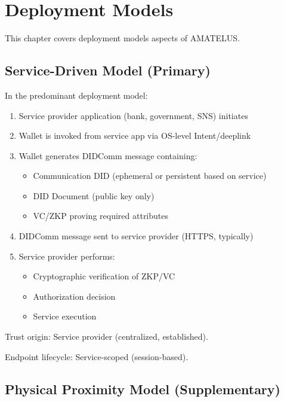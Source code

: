 \chapter{Deployment Models}


\begin{definition}
  \label{def:dep-chapter}
  This chapter covers deployment models aspects of AMATELUS.
  \leanok
\end{definition}
\section{Service-Driven Model (Primary)}

In the predominant deployment model:
\begin{enumerate}
  \item Service provider application (bank, government, SNS) initiates
  \item Wallet is invoked from service app via OS-level Intent/deeplink
  \item Wallet generates DIDComm message containing:
    \begin{itemize}
      \item Communication DID (ephemeral or persistent based on service)
      \item DID Document (public key only)
      \item VC/ZKP proving required attributes
    \end{itemize}
  \item DIDComm message sent to service provider (HTTPS, typically)
  \item Service provider performs:
    \begin{itemize}
      \item Cryptographic verification of ZKP/VC
      \item Authorization decision
      \item Service execution
    \end{itemize}
\end{enumerate}

Trust origin: Service provider (centralized, established).

Endpoint lifecycle: Service-scoped (session-based).

\section{Physical Proximity Model (Supplementary)}

